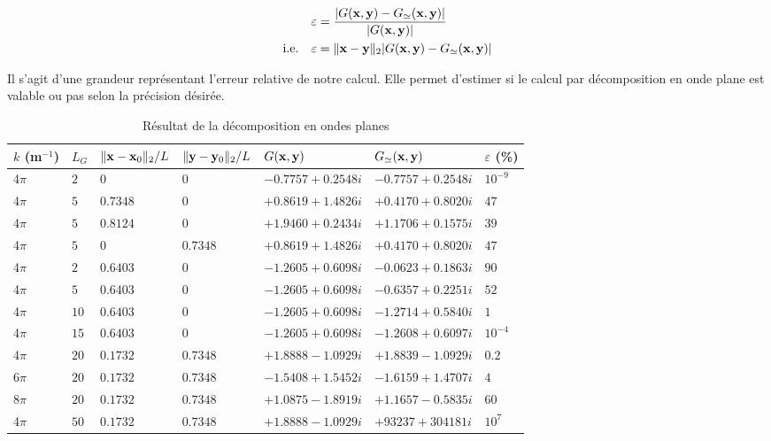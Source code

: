 \documentclass[10pt]{article}
\begin{document}
\begin{multicols}{2}
\begin{align}
 \varepsilon & = \frac{|G({\bf x}, {\bf y}) - G_{\simeq}({\bf x}, {\bf y})|}{|G({\bf x}, {\bf y})|} \\
 \text{i.e.} \quad \varepsilon & = \|{\bf x} -{\bf y}\|_{2}|G({\bf x}, {\bf y}) - G_{\simeq}({\bf x}, {\bf y})|
\end{align}


Il s'agit d'une grandeur représentant l'erreur relative de notre calcul. Elle permet d'estimer si le calcul par décomposition en onde plane est valable ou pas selon la précision désirée.


\end{multicols}


\begin{table}[H]
\centering
\begin{tabular}{m{1.5cm} m{0.5cm} | m{2cm} m{2cm} | m{3.5cm} m{3.5cm} m{1cm}} 
   \hline
    $k$ (m$^{-1}$)& $L_G$ & $\|{\bf x}-{\bf x}_0\|_{2}/L$ & $\|{\bf y}-{\bf y}_0\|_{2}/L$ & $G({\bf x}, {\bf y})$ & $G_{\simeq}({\bf x},{\bf y})$ & $\varepsilon$ (\%) \\
    \toprule
    \toprule
    4$\pi$ & $2$ & $0$ & $0$ & $-0.7757+0.2548i$ & $-0.7757+0.2548i$ & $10^{-9}$ \\ \hline
	4$\pi$ & $5$ & $0.7348$ & $0$ & $+0.8619+1.4826i$ & $+0.4170+0.8020i$ & $47$ \\
	4$\pi$ & $5$ & $0.8124$ & $0$ & $+1.9460+0.2434i$ & $+1.1706+0.1575i$ & $39$ \\
	4$\pi$ & $5$ & $0$ & $0.7348$ & $+0.8619+1.4826i$ & $+0.4170+0.8020i$ & $47$ \\ \hline
	4$\pi$ & $2$ & $0.6403$ & $0$ & $-1.2605+0.6098i$ & $-0.0623+0.1863i$ & $90$ \\
	4$\pi$ & $5$ & $0.6403$ & $0$ & $-1.2605+0.6098i$ & $-0.6357+0.2251i$ & $52$ \\
	4$\pi$ & $10$ & $0.6403$ & $0$ & $-1.2605+0.6098i$ & $-1.2714+0.5840i$ & $1$ \\
	4$\pi$ & $15$ & $0.6403$ & $0$ & $-1.2605+0.6098i$ & $-1.2608+0.6097i$ & $10^{-4}$\\ \hline 
	4$\pi$ & $20$ & $0.1732$ & $0.7348$ & $+1.8888-1.0929i$ & $+1.8839-1.0929i$ & $0.2$ \\
	6$\pi$ & $20$ & $0.1732$ & $0.7348$ & $-1.5408+1.5452i$ & $-1.6159+1.4707i$ & $4$ \\
	8$\pi$ & $20$ & $0.1732$ & $0.7348$ & $+1.0875-1.8919i$ & $+1.1657-0.5835i$ & $60$ \\ \hline
	4$\pi$ & $50$ & $0.1732$ & $0.7348$ & $+1.8888-1.0929i$ & $+93237+304181i$ & $10^{7}$ \\
    \hline
\end{tabular}
\caption{Résultat de la décomposition en ondes planes}
\label{tab:Q5}
\end{table}
\end{document}
